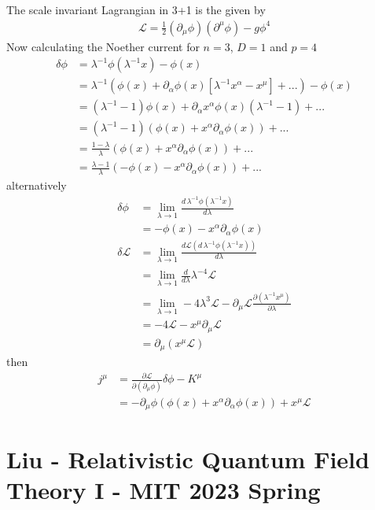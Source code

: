 \documentclass[../main.tex]{subfiles}
\begin{document}
The scale invariant Lagrangian in 3+1 is the given by
\begin{align}
\mathcal{L}=\frac{1}{2}(\partial_\mu\phi)(\partial^\mu\phi)-g\phi^4
\end{align} 
Now calculating the Noether current for $n=3$, $D=1$ and $p=4$
\begin{align}
\delta\phi&=\lambda^{-1}\phi(\lambda^{-1}x)-\phi(x)\\
&=\lambda^{-1}\left(\phi(x)+\partial_\alpha\phi(x)[\lambda^{-1}x^\alpha-x^\mu]+...\right)-\phi(x)\\
&=(\lambda^{-1}-1)\phi(x)+\partial_\alpha x^\alpha\phi(x)(\lambda^{-1}-1)+...\\
&=(\lambda^{-1}-1)(\phi(x)+x^\alpha\partial_\alpha\phi(x))+...\\
&=\frac{1-\lambda}{\lambda}(\phi(x)+x^\alpha\partial_\alpha\phi(x))+...\\
&=\frac{\lambda-1}{\lambda}(-\phi(x)-x^\alpha\partial_\alpha\phi(x))+...
\end{align}
alternatively
\begin{align}
\delta\phi&=\lim_{\lambda\rightarrow1}\frac{d\, \lambda^{-1}\phi(\lambda^{-1}x)}{d\lambda}\\
&=-\phi(x)-x^\alpha\partial_\alpha\phi(x)\\
\delta\mathcal{L}
&=\lim_{\lambda\rightarrow1}\frac{d\mathcal{L}(d\, \lambda^{-1}\phi(\lambda^{-1}x))}{d\lambda}\\
&=\lim_{\lambda\rightarrow1}\frac{d}{d\lambda}\lambda^{-4}\mathcal{L}\\
&=\lim_{\lambda\rightarrow1}-4\lambda^3\mathcal{L}-\partial_\mu\mathcal{L}\frac{\partial(\lambda^{-1}x^\mu)}{\partial\lambda}\\
&=-4\mathcal{L}-x^\mu\partial_\mu\mathcal{L}\\
&=\partial_\mu(x^\mu\mathcal{L})
\end{align}
then
\begin{align}
j^\mu&=\frac{\partial\mathcal{L}}{\partial(\partial_\mu\phi)}\delta\phi-K^\mu\\
&=-\partial_\mu\phi (\phi(x)+x^\alpha\partial_\alpha\phi(x))+x^\mu\mathcal{L}
\end{align}

\newpage
\section{{\sc Liu} - Relativistic Quantum Field Theory I - MIT 2023 Spring}
\end{document}
